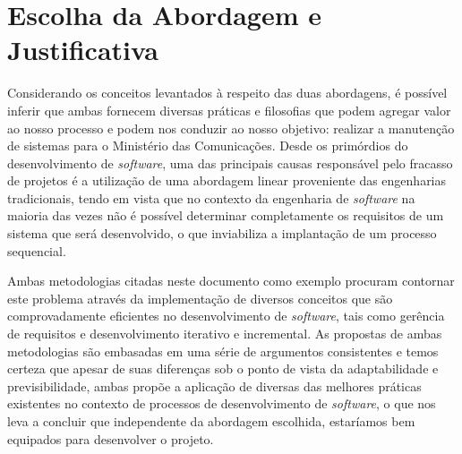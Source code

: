 \section{Escolha da Abordagem e Justificativa}
Considerando os conceitos levantados à respeito das duas abordagens, é possível inferir que ambas fornecem diversas práticas e filosofias que podem agregar valor ao nosso processo e podem nos conduzir ao nosso objetivo: realizar a manutenção de sistemas para o Ministério das Comunicações. Desde os primórdios do desenvolvimento de \emph{software}, uma das principais causas responsável pelo fracasso de projetos é a utilização de uma abordagem linear proveniente das engenharias tradicionais, tendo em vista que no contexto da engenharia de \emph{software} na maioria das vezes não é possível determinar completamente os requisitos de um sistema que será desenvolvido, o que inviabiliza a implantação de um processo sequencial.

Ambas metodologias citadas neste documento como exemplo procuram contornar este problema através da implementação de diversos conceitos que são comprovadamente eficientes no desenvolvimento de \emph{software}, tais como gerência de requisitos e desenvolvimento iterativo e incremental. As propostas de ambas metodologias são embasadas em uma série de argumentos consistentes e temos certeza que apesar de suas diferenças sob o ponto de vista da adaptabilidade e previsibilidade, ambas propõe a aplicação de diversas das melhores práticas existentes no contexto de processos de desenvolvimento de \emph{software}, o que nos leva a concluir que independente da abordagem escolhida, estaríamos bem equipados para desenvolver o projeto.

